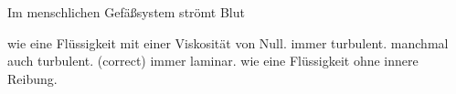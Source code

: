 \documentclass[11pt]{exam}
\begin{document}
\begin{questions}
\vspace{3mm}\question Im menschlichen Gefäßsystem strömt Blut

\begin{choices}
	\choice wie eine Flüssigkeit mit einer Viskosität von Null.
	\choice immer turbulent.
	\choice manchmal auch turbulent. (correct)
	\choice immer laminar.
	\choice wie eine Flüssigkeit ohne innere Reibung.
\end{choices}

\vspace{3mm}\end{questions}
\end{document}
